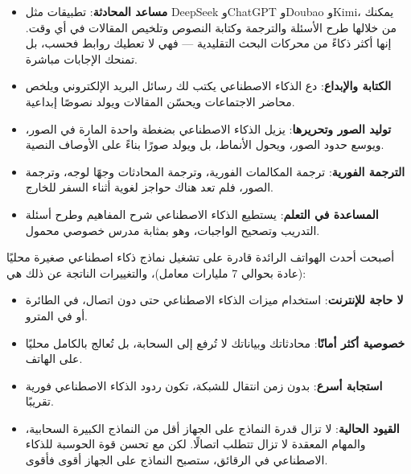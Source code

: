 
\begin{itemize}
  \item \textbf{مساعد المحادثة}: تطبيقات مثل DeepSeek وChatGPT وDoubao وKimi، يمكنك من خلالها طرح الأسئلة والترجمة وكتابة النصوص وتلخيص المقالات في أي وقت. إنها أكثر ذكاءً من محركات البحث التقليدية — فهي لا تعطيك روابط فحسب، بل تمنحك الإجابات مباشرة.
  \item \textbf{الكتابة والإبداع}: دع الذكاء الاصطناعي يكتب لك رسائل البريد الإلكتروني ويلخص محاضر الاجتماعات ويحسّن المقالات ويولد نصوصًا إبداعية.
  \item \textbf{توليد الصور وتحريرها}: يزيل الذكاء الاصطناعي بضغطة واحدة المارة في الصور، ويوسع حدود الصور، ويحول الأنماط، بل ويولد صورًا بناءً على الأوصاف النصية.
  \item \textbf{الترجمة الفورية}: ترجمة المكالمات الفورية، وترجمة المحادثات وجهًا لوجه، وترجمة الصور، فلم تعد هناك حواجز لغوية أثناء السفر للخارج.
  \item \textbf{المساعدة في التعلم}: يستطيع الذكاء الاصطناعي شرح المفاهيم وطرح أسئلة التدريب وتصحيح الواجبات، وهو بمثابة مدرس خصوصي محمول.
\end{itemize}


أصبحت أحدث الهواتف الرائدة قادرة على تشغيل نماذج ذكاء اصطناعي صغيرة محليًا (عادة بحوالي 7 مليارات معامل)، والتغييرات الناتجة عن ذلك هي:

\begin{itemize}
  \item \textbf{لا حاجة للإنترنت}: استخدام ميزات الذكاء الاصطناعي حتى دون اتصال، في الطائرة أو في المترو.
  \item \textbf{خصوصية أكثر أمانًا}: محادثاتك وبياناتك لا تُرفع إلى السحابة، بل تُعالج بالكامل محليًا على الهاتف.
  \item \textbf{استجابة أسرع}: بدون زمن انتقال للشبكة، تكون ردود الذكاء الاصطناعي فورية تقريبًا.
  \item \textbf{القيود الحالية}: لا تزال قدرة النماذج على الجهاز أقل من النماذج الكبيرة السحابية، والمهام المعقدة لا تزال تتطلب اتصالًا. لكن مع تحسن قوة الحوسبة للذكاء الاصطناعي في الرقائق، ستصبح النماذج على الجهاز أقوى فأقوى.
\end{itemize}


